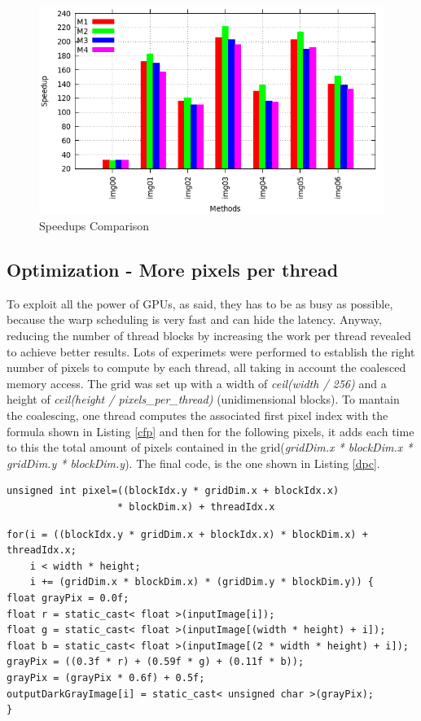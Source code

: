 \documentclass[a4paper]{article}
\begin{document}
\begin{figure}[!ht]
    \centering
    \includegraphics[width=0.9\linewidth]{res/new/darker_confronto}
    \caption{Speedups Comparison}
    \label{fig:histo_darker}
\end{figure}
\FloatBarrier


\subsection{Optimization - More pixels per thread}
\label{sec:dfm}
To exploit all the power of GPUs, as said, they has to be as busy as possible, because the warp scheduling is very fast and can hide the latency. Anyway, reducing the number of thread blocks by increasing the work per thread revealed to achieve better results. Lots of experimets were performed to establish the right number of pixels to compute by each thread, all taking in account the coalesced memory access. The grid was set up with a width of \textit{ceil(width / 256)} and a height of \textit{ceil(height / pixels\_per\_thread)} (unidimensional blocks). To mantain the coalescing, one thread computes the associated first pixel index with the formula shown in Listing \ref{cfp} and then for the following pixels, it adds each time to this the total amount of pixels contained in the grid(\textit{gridDim.x * blockDim.x * gridDim.y * blockDim.y}). The final code, is the one shown in Listing \ref{dpc}. 

\begin{lstlisting}[label=cfp, caption=Corresponding first pixel]
unsigned int pixel=((blockIdx.y * gridDim.x + blockIdx.x) 
                   * blockDim.x) + threadIdx.x
\end{lstlisting}
\FloatBarrier

\begin{lstlisting}[label=dpc, caption=Darker Parallel Code]
for(i = ((blockIdx.y * gridDim.x + blockIdx.x) * blockDim.x) + threadIdx.x; 
    i < width * height; 
    i += (gridDim.x * blockDim.x) * (gridDim.y * blockDim.y)) {
float grayPix = 0.0f;
float r = static_cast< float >(inputImage[i]);
float g = static_cast< float >(inputImage[(width * height) + i]);
float b = static_cast< float >(inputImage[(2 * width * height) + i]);
grayPix = ((0.3f * r) + (0.59f * g) + (0.11f * b));
grayPix = (grayPix * 0.6f) + 0.5f;
outputDarkGrayImage[i] = static_cast< unsigned char >(grayPix);
}
\end{lstlisting}
\FloatBarrier
\end{document}
